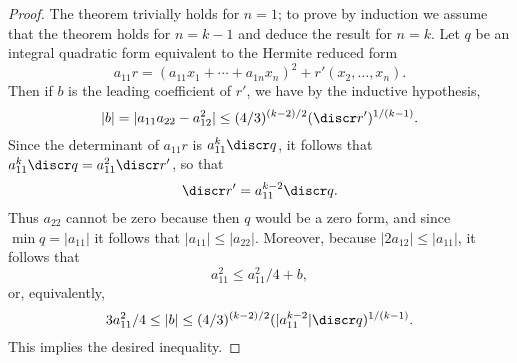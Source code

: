 \begin{proof}
  The theorem trivially holds for \(n = 1\); to prove by induction we assume that the theorem holds for \(n = k - 1\) and deduce the result for \(n = k\). Let \(q\) be an integral quadratic form equivalent to the Hermite reduced form
  \[
    a_{11} r = (a_{11}x_1 + \cdots + a_{1n}x_n)^2 + r'(x_2, \dots, x_n).
  \]
  Then if \(b\) is the leading coefficient of \(r'\), we have by the inductive hypothesis,
  \[
    |b| = |a_{11}a_{22} - a_{12}^2| \leq (4/3)^{(k-2)/2} ({\discr r'})^{1/(k-1)}.
  \]
  Since the determinant of \(a_{11} r\) is \(a_{11}^k \discr q\), it follows that \(a_{11}^k \discr q = a_{11}^2 \discr r'\), so that \[\discr r' = a_{11}^{k-2} \discr q.\] Thus \(a_{22}\) cannot be zero because then \(q\) would be a zero form, and since \(\min q = |a_{11}|\) it follows that \(|a_{11}| \leq |a_{22}|\). Moreover, because \(|2a_{12}| \leq |a_{11}|\), it follows that
  \[
    a_{11}^2 \leq a_{11}^2/4 + b,
  \]
  or, equivalently,
  \[
    3a_{11}^2/4 \leq |b| \leq (4/3)^{(k-2)/2} (|a^{k-2}_{11}| \discr q)^{1/(k-1)}.
  \]
  This implies the desired inequality.
\end{proof}